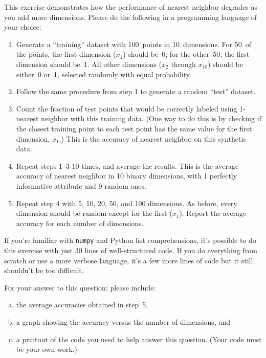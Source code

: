 \begin{problem}
   This exercise demonstrates how the performance of nearest neighbor degrades as you add more dimensions. Please do the following in a programming language of your choice:

\begin{enumerate}
  \item Generate a “training” dataset with 100~points in 10~dimensions. For 50~of the points, the first dimension ($x_1$) should be~0; for the other~50, the first dimension should be~1. All other dimensions ($x_2$ through $x_{10}$) should be either~0 or~1, selected randomly with equal probability.

  \item Follow the same procedure from step 1 to generate a random ``test'' dataset.

  \item Count the fraction of test points that would be correctly labeled using 1-nearest neighbor with this training data. (One way to do this is by checking if the closest training point to each test point has the same value for the first dimension, $x_1$.) This is the accuracy of nearest neighbor on this synthetic data.

  \item Repeat steps 1--3 10 times, and average the results. This is the average accuracy of nearest neighbor in 10 binary dimensions, with 1 perfectly informative attribute and 9 random ones.

  \item Repeat step 4 with 5, 10, 20, 50, and 100 dimensions. As before, every dimension should be random except for the first ($x_1$). Report the average accuracy for each number of dimensions.
\end{enumerate}

If you're familiar with \texttt{numpy} and Python list comprehensions, it’s possible to do this exercise with just 30 lines of well-structured code. If you do everything from scratch or use a more verbose language, it’s a few more lines of code but it still shouldn't be too difficult.

For your answer to this question: please include:

\begin{enumerate}[(a)]
  \item the average accuracies obtained in step~5,
  \item a graph showing the accuracy versus the number of dimensions, and
  \item a printout of the code you used to help answer this question. (Your code must be your own work.)
\end{enumerate}
\end{problem}
